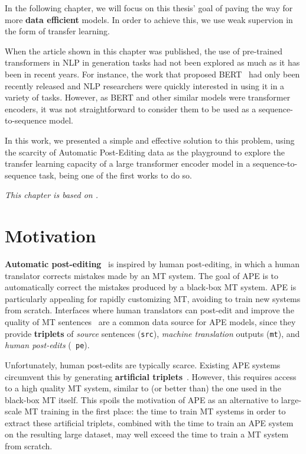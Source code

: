 \label{cap:ape}

In the following chapter, we will focus on this thesis' goal of
paving the way for more \textbf{data efficient} models. In order to
achieve this, we use weak supervion in the form of transfer learning.

When the article shown in this chapter was published, the use of
pre-trained transformers %
in NLP in generation tasks had not been explored as much as it has
been in recent years. %
For instance, the work that proposed
BERT~\citep{devlin2018bert} had only been recently released and NLP
researchers were quickly interested in using it in a variety of
tasks. However, as BERT and other similar models were transformer
encoders, it was not straightforward to consider them to be used
as a sequence-to-sequence model. %

In this work, we presented a simple and effective
solution to this problem, using the scarcity of Automatic Post-Editing
data as the playground to explore the transfer learning capacity of a
large transformer encoder model in a sequence-to-sequence task,
being one of the first works to do so.

\emph{This chapter is based on \citet{Correia2019}.}

\section{Motivation}

 {\bf Automatic post-editing}~\citep[APE;][]{simard2007rule} is
inspired by human post-editing, in which a human translator corrects
mistakes made by an MT system.
The goal of APE is to automatically correct the mistakes produced by
a black-box MT system. APE is particularly
appealing for rapidly customizing MT, avoiding to train new systems
from scratch. Interfaces where human translators can post-edit and
improve the quality of MT
sentences~\citep{Alabau2014,Federico2014,Denkowski2015,Hokamp2018}
are a common data source for APE models, since they provide {\bf
    triplets} of {\it source} sentences ({\tt src}), {\it machine
    translation} outputs ({\tt mt}), and {\it human post-edits} ({\tt
    pe}).

Unfortunately, human post-edits are typically scarce. Existing APE
systems circumvent this by generating {\bf artificial
    triplets}~\citep{junczys2016log, negri2018escape}. However, this
requires access to a high quality MT system, similar to (or better
than) the one used in the black-box MT itself. This spoils the
motivation of APE as an alternative to large-scale MT training in the
first place: the time to train MT systems in order to extract these
artificial triplets, combined with the time to train an APE system on
the resulting large dataset, may well exceed the time to train a MT
system from scratch.

